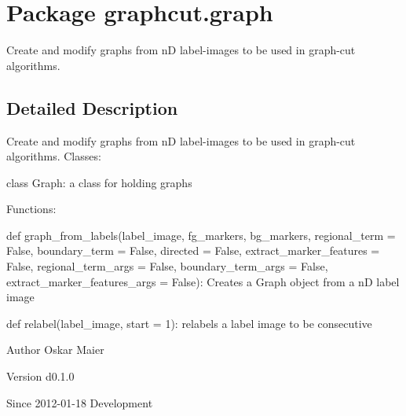 \hypertarget{namespacegraphcut_1_1graph}{
\section{Package graphcut.graph}
\label{namespacegraphcut_1_1graph}
}


Create and modify graphs from nD label-\/images to be used in graph-\/cut algorithms.  




\subsection{Detailed Description}
Create and modify graphs from nD label-\/images to be used in graph-\/cut algorithms. Classes:
\begin{DoxyItemize}
\item class Graph: a class for holding graphs
\end{DoxyItemize}

Functions:
\begin{DoxyItemize}
\item def graph\_\-from\_\-labels(label\_\-image, fg\_\-markers, bg\_\-markers, regional\_\-term = False, boundary\_\-term = False, directed = False, extract\_\-marker\_\-features = False, regional\_\-term\_\-args = False, boundary\_\-term\_\-args = False, extract\_\-marker\_\-features\_\-args = False): Creates a Graph object from a nD label image
\item def relabel(label\_\-image, start = 1): relabels a label image to be consecutive
\end{DoxyItemize}

\begin{DoxyAuthor}{Author}
Oskar Maier 
\end{DoxyAuthor}
\begin{DoxyVersion}{Version}
d0.1.0 
\end{DoxyVersion}
\begin{DoxySince}{Since}
2012-\/01-\/18  Development 
\end{DoxySince}
